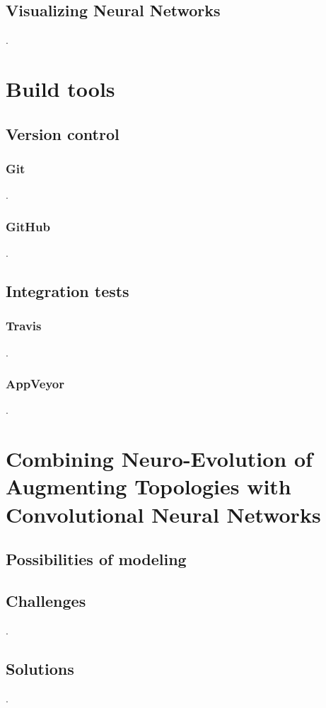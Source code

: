 \documentclass[11pt]{article}
\begin{document}
		\subsection{Visualizing Neural Networks}
			.
	\newpage

	\section{Build tools}
		\subsection{Version control}
			\subsubsection{Git}
				.
			\subsubsection{GitHub}
				.
		\subsection{Integration tests}
			\subsubsection{Travis}
				.
			\subsubsection{AppVeyor}
				.
	\newpage

	\section{Combining Neuro-Evolution of Augmenting Topologies with Convolutional Neural Networks}
		\subsection{Possibilities of modeling}
			
		\subsection{Challenges}
			.
		\subsection{Solutions}
			.
\end{document}
